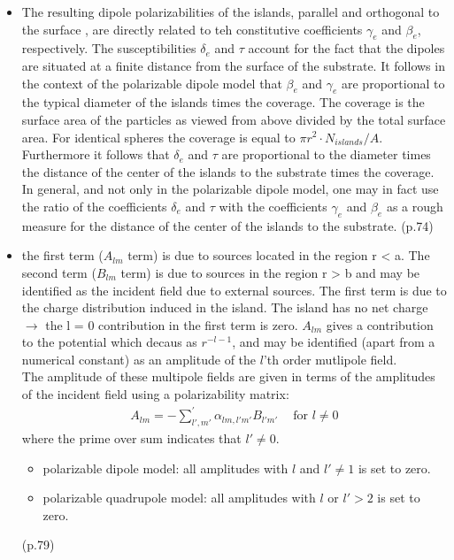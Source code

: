 \begin{itemize}
\item The resulting dipole polarizabilities of the islands, parallel and orthogonal to the
surface , are directly related to teh constitutive coefficients $\gamma_e$ and $\beta_e$, respectively.
The susceptibilities $\delta_e$ and $\tau$ account for the fact that the dipoles are situated at a
finite distance from the surface of the substrate. It follows in the context of the polarizable
dipole model that $\beta_e$ and $\gamma_e$ are proportional to the typical diameter of the islands times the
coverage. The coverage is the surface area of the particles as viewed from above divided by
the total surface area. For identical spheres the coverage is equal to $\pi r^2 \cdot N_{islands}/A$.
Furthermore it follows that $\delta_e$ and $\tau$ are proportional to the diameter times the distance
of the center of the islands to the substrate times the coverage.\\
In general, and not only in the polarizable dipole model, one may in fact use the ratio of the coefficients
$\delta_e$ and $\tau$ with the coefficients $\gamma_e$ and $\beta_e$ as a rough measure for the distance
of the center of the islands to the substrate. (p.74) 

\item  the first term ($A_{lm}$ term) is due to sources located in the region r < a.
The second term ($B_{lm}$ term) is due to sources in the region r > b and may be identified
as the incident field due to external sources. The first term is due to the charge distribution induced
in the island. The island has no net charge $\rightarrow$ the l = 0 contribution in the first term
is zero. $A_{lm}$ gives a contribution to the potential which decaus as $r^{-l-1}$, and may be
identified (apart from a numerical constant) as an amplitude of the $l$'th order mutlipole field. 
\\
The amplitude of these multipole fields are given in terms of the amplitudes of the 
incident field using a polarizability matrix:
\begin{align}
A_{lm} = - \sum\limits^{'}_{l',m'} \alpha_{lm,l'm'} B_{l'm'} \:\:\:\:\text{ for } l \neq 0
\end{align}
where the prime over sum indicates that $l' \neq 0$.
   \begin{itemize}
      \item polarizable dipole model:  all amplitudes with $l$ and $l' \neq 1$ is set to zero.
      \item polarizable quadrupole model: all amplitudes with $l$ or $l' > 2$ is set to zero.
   \end{itemize}
   (p.79)


\end{itemize}
